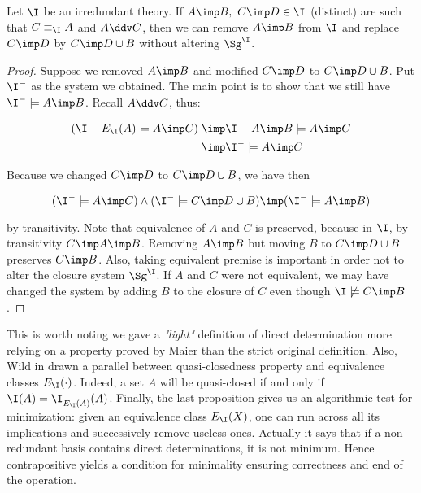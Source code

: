 \begin{proposition} Let $\I$ be an irredundant theory. If $A \imp B, \ C \imp D 
\in \I$ (distinct) are such that $C \equiv_{\I} A$ and $A \ddv C$, then we can remove $A \imp B$ from $\I$ and replace $C \imp D$ by $C \imp D \cup B$ without 
altering $\Sg^{\I}$.
\end{proposition}

\begin{proof} Suppose we removed $A \imp B$ and modified $C \imp D$ to $C \imp D \cup B$. Put $\I^{-}$ as the system we obtained. The main point is to show that we still have $\I^{-} \models A \imp B$. Recall $A \ddv C$, thus:

\begin{align*}
	(\I - E_{\I}(A) \models A \imp C) & \; \imp \I - A \imp B \models A \imp 
	C \\
	& \; \imp \I^{-} \models A \imp C \\ 
\end{align*}

\noindent Because we changed $C \imp D$ to $C \imp D \cup B$, we have then

\[ (\I^{-} \models A \imp C) \land (\I^{-} \models C \imp D \cup B) \imp
	(\I^{-} \models A \imp B) \]

\noindent by transitivity. Note that equivalence of $A$ and $C$ is 
preserved, because in $\I$, by transitivity $C \imp A \imp B$. Removing $A \imp 
B$ but moving $B$ to $C \imp D \cup B$ preserves $C \imp B$. Also, taking 
equivalent premise is important in order not to alter the closure system 
$\Sg^{\I}$. If $A$ and $C$ were not equivalent, we may have changed the system 
by adding $B$ to the closure of $C$ even though $\I \not\models C \imp B$.
\end{proof}

\vspace{1.2em}

This is worth noting we gave a \textit{"light"} definition of direct determination more relying on a property proved by Maier than the strict original definition. Also, Wild in \cite{wild_implicational_1989, wild_theory_1994} drawn a parallel between quasi-closedness property and equivalence classes $E_{\I}(\cdot)$. Indeed, a set $A$ will be quasi-closed if and only if $\I(A) = \I^{-}_{E_{\I}(A)}(A)$. Finally, the last proposition gives us an algorithmic test for minimization: given an equivalence class $E_{\I}(X)$, one can run across all its implications and successively remove useless ones. Actually it says that if a non-redundant basis contains direct determinations, it is not minimum. Hence contrapositive yields a condition for minimality ensuring correctness and end of the operation.

